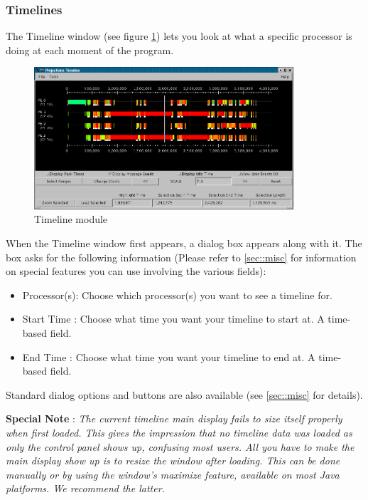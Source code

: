 \documentclass[10pt]{article}
\begin{document}
\subsubsection{Timelines}
\label{sec::timeline view}


The Timeline window (see figure \ref{timeline}) lets you look at what
a specific processor is doing at each moment of the program.

\begin{figure}[htb]
\center
\includegraphics[width=3.8in]{fig/timeline}
\caption{Timeline module}
\label{timeline}
\end{figure}


When the Timeline window first appears, a dialog box appears along
with it. The box asks for the following information (Please refer to
\ref{sec::misc} for information on special features you can
use involving the various fields):

\begin{itemize}
\item
Processor(s): Choose which processor(s) you want to see a timeline
for.
\item
Start Time  : Choose what time you want your timeline to start at.
A time-based field.
\item
End Time    : Choose what time you want your timeline to end at. A time-based
field.
\end{itemize}

Standard \projections{} dialog options and buttons are also available
(see \ref{sec::misc} for details).

{\bf Special Note} : {\it The current timeline main display fails to
size itself properly when first loaded. This gives the impression that
no timeline data was loaded as only the control panel shows up,
confusing most users. All you have to make the main display show up is
to resize the window after loading. This can be done manually or by
using the window's maximize feature, available on most Java
platforms. We recommend the latter.}
\end{document}
